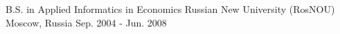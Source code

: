 
\begin{cventries}

  \cventry
    {B.S. in Applied Informatics in Economics}
    {Russian New University (RosNOU)}
    {Moscow, Russia}
    {Sep. 2004 - Jun. 2008}
    {}

\end{cventries}
